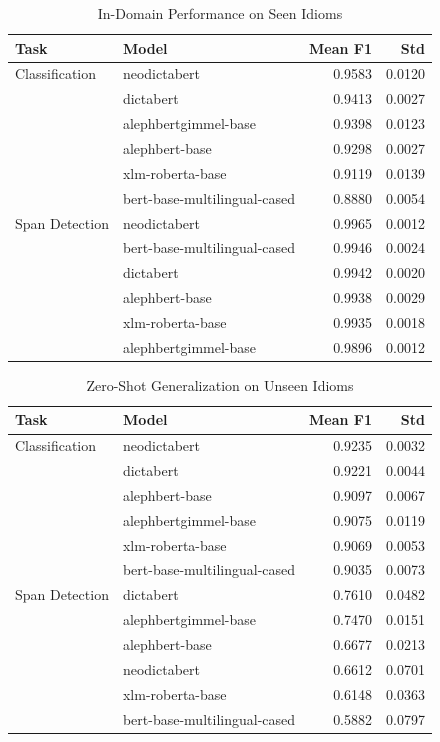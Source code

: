 
\begin{table}[htbp]
\centering
\caption{In-Domain Performance on Seen Idioms}
\label{tab:seen_performance}
\begin{tabular}{llrr}
\toprule
Task & Model & Mean F1 & Std \\
\midrule
Classification & neodictabert & 0.9583 & 0.0120 \\
 & dictabert & 0.9413 & 0.0027 \\
 & alephbertgimmel-base & 0.9398 & 0.0123 \\
 & alephbert-base & 0.9298 & 0.0027 \\
 & xlm-roberta-base & 0.9119 & 0.0139 \\
 & bert-base-multilingual-cased & 0.8880 & 0.0054 \\
\midrule
Span Detection & neodictabert & 0.9965 & 0.0012 \\
 & bert-base-multilingual-cased & 0.9946 & 0.0024 \\
 & dictabert & 0.9942 & 0.0020 \\
 & alephbert-base & 0.9938 & 0.0029 \\
 & xlm-roberta-base & 0.9935 & 0.0018 \\
 & alephbertgimmel-base & 0.9896 & 0.0012 \\
\bottomrule
\end{tabular}
\end{table}

\begin{table}[htbp]
\centering
\caption{Zero-Shot Generalization on Unseen Idioms}
\label{tab:unseen_performance}
\begin{tabular}{llrr}
\toprule
Task & Model & Mean F1 & Std \\
\midrule
Classification & neodictabert & 0.9235 & 0.0032 \\
 & dictabert & 0.9221 & 0.0044 \\
 & alephbert-base & 0.9097 & 0.0067 \\
 & alephbertgimmel-base & 0.9075 & 0.0119 \\
 & xlm-roberta-base & 0.9069 & 0.0053 \\
 & bert-base-multilingual-cased & 0.9035 & 0.0073 \\
\midrule
Span Detection & dictabert & 0.7610 & 0.0482 \\
 & alephbertgimmel-base & 0.7470 & 0.0151 \\
 & alephbert-base & 0.6677 & 0.0213 \\
 & neodictabert & 0.6612 & 0.0701 \\
 & xlm-roberta-base & 0.6148 & 0.0363 \\
 & bert-base-multilingual-cased & 0.5882 & 0.0797 \\
\bottomrule
\end{tabular}
\end{table}